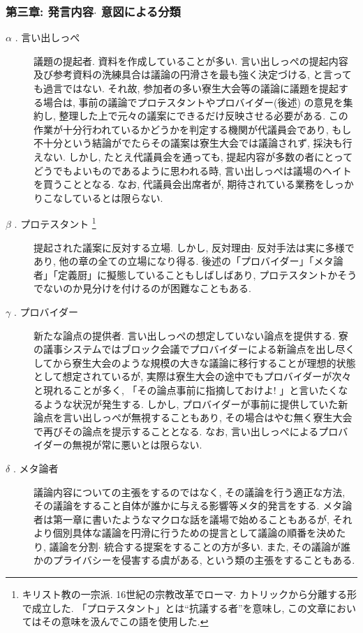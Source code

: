 \documentclass[10pt,b5jsbook,dvips,dvipdfmx,openany]{jsbook}
\theoremstyle{definition}
\begin{document}
			\subsubsection{第三章: 発言内容$ \cdot $ 意図による分類}
			\begin{description}

			\item[$ \alpha $ . 言い出しっぺ]

			議題の提起者. 資料を作成していることが多い. 言い出しっぺの提起内容及び参考資料の洗練具合は議論の円滑さを最も強く決定づける, と言っても過言ではない. それ故, 参加者の多い寮生大会等の議論に議題を提起する場合は, 事前の議論でプロテスタントやプロバイダー(後述) の意見を集約し, 整理した上で元々の議案にできるだけ反映させる必要がある. この作業が十分行われているかどうかを判定する機関が代議員会であり, もし不十分という結論がでたらその議案は寮生大会では議論されず, 採決も行えない. しかし, たとえ代議員会を通っても, 提起内容が多数の者にとってどうでもよいものであるように思われる時, 言い出しっぺは議場のヘイトを買うこととなる. なお, 代議員会出席者が, 期待されている業務をしっかりこなしているとは限らない.

			\item[$ \beta $ . プロテスタント \footnote{キリスト教の一宗派. 16世紀の宗教改革でローマ$ \cdot $ カトリックから分離する形で成立した. 「プロテスタント」とは``抗議する者''を意味し, この文章においてはその意味を汲んでこの語を使用した. }]
			提起された議案に反対する立場. しかし, 反対理由$ \cdot $ 反対手法は実に多様であり, 他の章の全ての立場になり得る. 後述の「プロバイダー」「メタ論者」「定義厨」に擬態していることもしばしばあり, プロテスタントかそうでないのか見分けを付けるのが困難なこともある.


			\item[$ \gamma $ . プロバイダー]

			新たな論点の提供者. 言い出しっぺの想定していない論点を提供する. 寮の議事システムではブロック会議でプロバイダーによる新論点を出し尽くしてから寮生大会のような規模の大きな議論に移行することが理想的状態として想定されているが, 実際は寮生大会の途中でもプロバイダーが次々と現れることが多く, 「その論点事前に指摘しておけよ! 」と言いたくなるような状況が発生する. しかし, プロバイダーが事前に提供していた新論点を言い出しっぺが無視することもあり, その場合はやむ無く寮生大会で再びその論点を提示することとなる. なお, 言い出しっぺによるプロバイダーの無視が常に悪いとは限らない.


			\item[$ \delta $ . メタ論者]

			議論内容についての主張をするのではなく, その議論を行う適正な方法, その議論をすること自体が誰かに与える影響等メタ的発言をする.
メタ論者は第一章に書いたようなマクロな話を議場で始めることもあるが, それより個別具体な議論を円滑に行うための提言として議論の順番を決めたり, 議論を分割$ \cdot $ 統合する提案をすることの方が多い. また, その議論が誰かのプライバシーを侵害する虞がある, という類の主張をすることもある.


\end{description}
\end{document}
